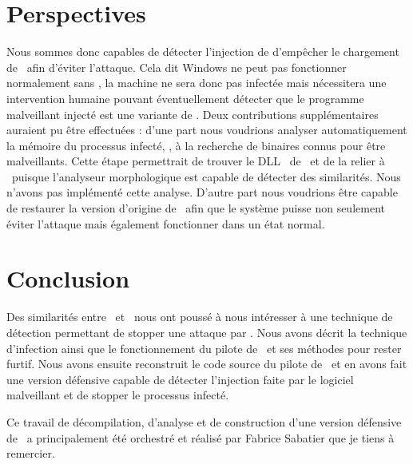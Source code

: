 \section{Perspectives}
Nous sommes donc capables de détecter l'injection de d'empêcher le chargement de \services\ afin d'éviter l'attaque.
Cela dit Windows ne peut pas fonctionner normalement sans \services, la machine ne sera donc pas infectée mais nécessitera une intervention humaine pouvant éventuellement détecter que le programme malveillant injecté est une variante de \stux.
Deux contributions supplémentaires auraient pu être effectuées : d'une part nous voudrions analyser automatiquement la mémoire du processus infecté, \services, à la recherche de binaires connus pour être malveillants. 
Cette étape permettrait de trouver le DLL \netpDLL\ de \duqu\ et de la relier à \stux\ puisque l'analyseur morphologique est capable de détecter des similarités. Nous n'avons pas implémenté cette analyse.
D'autre part nous voudrions être capable de restaurer la version d'origine de \services\ afin que le système puisse non seulement éviter l'attaque mais également fonctionner dans un état normal.

\section*{Conclusion}
Des similarités entre \duqu\ et \stux\ nous ont poussé à nous intéresser à une technique de détection permettant de stopper une attaque par \duqu.
Nous avons décrit la technique d'infection ainsi que le fonctionnement du pilote de \duqu\ et ses méthodes pour rester furtif.
Nous avons ensuite reconstruit le code source du pilote de \duqu\ et en avons fait une version défensive capable de détecter l'injection faite par le logiciel malveillant et de stopper le processus infecté.

Ce travail de décompilation, d'analyse et de construction d'une version défensive de \duqu\ a principalement été orchestré et réalisé par Fabrice Sabatier que je tiens à remercier.
